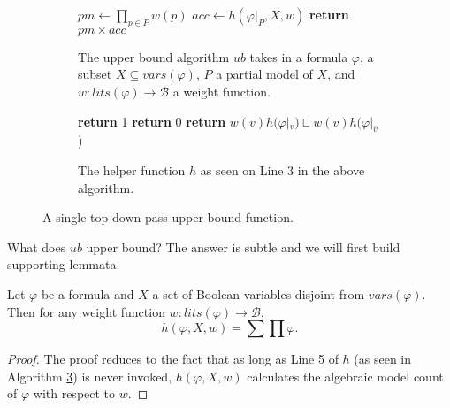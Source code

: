 \documentclass[acmsmall,review]{acmart}\settopmatter{printfolios=true,printccs=false,printacmref=false}
\begin{document}
\begin{figure}[H]
  \begin{subfigure}{1 \textwidth}
    \begin{mdframed}{\begin{algorithmic}[1]
      \State $pm \gets \prod_{p \in P} w(p)$ 
      \State $acc \gets h(\varphi|_P, X, w)$
      \State \textbf{return} $pm \times acc$
      \EndProcedure
    \end{algorithmic}}
    \end{mdframed}
    \caption{The upper bound algorithm $ub$ takes in a formula $\varphi$, a subset $X \subseteq vars(\varphi)$, $P$ a partial model of $X$, and $w : lits(\varphi) \to \mathcal B$ a weight function.}
    \label{ub algo}
  \end{subfigure}
  \begin{subfigure}{1 \textwidth}
    \begin{mdframed}{\begin{algorithmic}[1]
      \If {$\varphi = \top$} \textbf{return} 1
      \ElsIf {$\varphi = \bot$} \textbf{return} 0
          \textbf{return} $w(v)h(\varphi|_v) \sqcup w(\overline v)h(\varphi|_{\overline v}$)
        \EndIf
      \EndIf
      \EndProcedure
    \end{algorithmic}}
    \end{mdframed}
    \caption{The helper function $h$ as seen on Line 3 in the above algorithm.}
    \label{h algo}
  \end{subfigure}
  \caption{A single top-down pass upper-bound function.}
\end{figure}

What does $ub$ upper bound? The answer is subtle and we will first build supporting lemmata. 

\begin{lemma}\label{h invariant for total models}
  Let $\varphi$ be a formula and $X$ a set of Boolean variables disjoint from $vars(\varphi)$. Then for any weight function $w : lits(\varphi) \to \mathcal B$,
  \begin{equation}
    h(\varphi, X, w) = \sum\prod \varphi.
  \end{equation}
\end{lemma}

\begin{proof}
  The proof reduces to the fact that as long as Line 5 of $h$ (as seen in Algorithm \ref{h algo}) is never invoked, $h(\varphi, X,w)$ calculates the algebraic model count of $\varphi$ with respect to $w$.
\end{proof}
\end{document}
